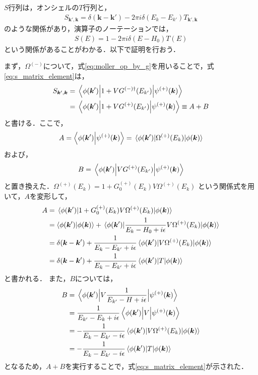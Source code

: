 \documentclass[a4paper,11pt]{ltjsarticle}
\begin{document}
$S$行列は，オンシェルの$T$行列と， 
\begin{align}\label{eq:s_matrix_by_t}
  S_{\bm{k}', \bm{k}} = \delta(\bm{k} - \bm{k}') - 2 \pi i \delta(E_k - E_{k'}) T_{\bm{k}', \bm{k}}
\end{align}
のような関係があり，演算子のノーテーションでは，
\begin{align}
  S(E) = 1 - 2\pi i \delta(E-H_0) T(E)
\end{align}
という関係があることがわかる．以下で証明を行おう．

まず，$\Omega^{(-)}$について，式\ref{eq:moller_op_by_g}を用いることで，式\ref{eq:s_matrix_element}は，
\begin{align}\label{eq:S_matrix_by_g}
  S_{\bm{k}', \bm{k}} &= \mel{\phi(\bm{k}')}{1+VG^{(-)\dagger}(E_{k'})}{\psi^{(+)}(\bm{k})} \notag \\
  &= \mel{\phi(\bm{k}')}{1+VG^{(+)}(E_{k'})}{\psi^{(+)}(\bm{k})} \equiv A + B
\end{align}
と書ける．ここで，
\begin{align}
  A = \braket{\phi(\bm{k}')}{\psi^{(+)}(\bm{k})} = \mel{\phi(\bm{k}')}{\Omega^{(+)}(E_k)}{\phi(\bm{k})}
\end{align}
および，
\begin{align}
  B = \mel{\phi(\bm{k}')}{VG^{(+)}(E_{k'})}{\psi^{(+)}(\bm{k})}
\end{align}
と置き換えた．$\Omega^{(+)}(E_k) = 1 + G_0^{(+)}(E_k)V\Omega^{(+)}(E_k)$
という関係式を用いて，$A$を変形して，
\begin{align}
  A 
  &= \mel{\phi(\bm{k}')}{1 + G_0^{(+)}(E_{k})V\Omega^{(+)}(E_{k})}{\phi(\bm{k})} \notag \\
  &= \braket{\phi(\bm{k}')}{\phi(\bm{k})} + \mel{\phi(\bm{k}')}{\frac{1}{E_k - H_0 + i\epsilon}V\Omega^{(+)}(E_k)}{\phi(\bm{k})}  \notag \\
  &= \delta(\bm{k}-\bm{k}') + \frac{1}{E_k - E_{k'} + i\epsilon}\mel{\phi(\bm{k}')}{V\Omega^{(+)}(E_k)}{\phi(\bm{k})} \notag \\
  &= \delta(\bm{k}-\bm{k}') + \frac{1}{E_k - E_{k'} + i\epsilon}\mel{\phi(\bm{k}')}{T}{\phi(\bm{k})} 
\end{align}
と書かれる．
また，$B$については，
\begin{align}
  B 
  &= \mel{\phi(\bm{k}')}{V \frac{1}{E_{k'} - H + i\epsilon}}{\psi^{(+)}(\bm{k})} \notag \\
  &= \frac{1}{E_{k'} - E_k + i\epsilon} \mel{\phi(\bm{k}')}{V}{\psi^{(+)}(\bm{k})} \notag \\
  &= - \frac{1}{E_k - E_{k'} - i \epsilon} \mel{\phi(\bm{k}')}{V \Omega^{(+)}(E_k)}{\phi(\bm{k})} \notag \\
  &= - \frac{1}{E_k - E_{k'} - i \epsilon} \mel{\phi(\bm{k}')}{T}{\phi(\bm{k})} 
\end{align}
となるため，$A+B$を実行することで，式\ref{eq:s_matrix_element}が示された．
\end{document}
